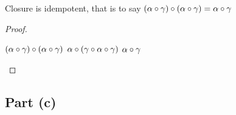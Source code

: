 \begin{lemma}\label{lemma:closure-idemp}
  Closure is idempotent, that is to say
  ${(\alpha\circ\gamma)\circ(\alpha\circ\gamma) = \alpha\circ\gamma}$
  \begin{proof}~\\
    \begin{itemize}
      \step $(\alpha\circ\gamma)\circ(\alpha\circ\gamma)$
      \step[=] $\alpha\circ(\gamma\circ\alpha\circ\gamma)$
      \step[=] $\alpha\circ\gamma$\qedhere
    \end{itemize}
  \end{proof}
\end{lemma}

\subsection{Part (c)}\label{sec:q-1-c}

